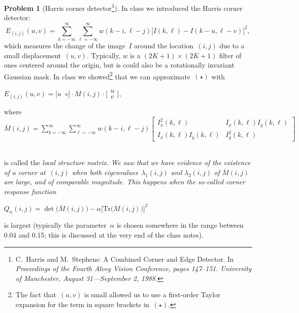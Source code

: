 \documentclass[11pt]{article}
\theoremstyle{plain}
\theoremstyle{definition}
\newtheorem{problem}{Problem}
\theoremstyle{remark}
\begin{document}
\begin{problem}[Harris corner detector\footnote{\label{fn}C.~Harris and 
	M.~Stephens: A Combined Corner and Edge Detector.
In \em Proceedings of the Fourth Alvey Vision Conference\em\/, pages 147--151. University of Manchester,
August 31---September 2,
1988.}]
In class we introduced the Harris corner detector:
$$
E_{(i,j)}(u,v)
= 
\sum_{k=-\infty}^{\infty}
\sum_{\ell=-\infty}^{\infty}
w(k-i,\ell-j)
\big[I(k,\ell)-I(k-u,\ell-v)\big]^2,
$$ 
which measures the change of the image~$I$ 
around the location~$(i,j)$
due to a small displacement~$(u,v)$. 
Typically, $w$ is a $(2K+1)\times(2K+1)$
filter of ones centered around the origin,
but is could also be a rotationally invariant
Gaussian mask. In class we showed\footnote{The fact that~$(u,v)$
is small allowed us to use a first-order
Taylor expansion for the term in square brackets in~$(\star)$.} 
 that we can approximate~$(\star)$ with
\par\vspace{.15cm}
\hfill
$\displaystyle
E_{(i,j)}(u,v)
= 
\big[u\;\;v\big]\cdot
\overline{M}(i,j)
\cdot
\Big[
\!
\begin{array}{c}
u \\
v
\end{array}%
\!
\Big],
$\hfill
\mbox{ }
\par\vspace{.15cm}
where
\hfill
$
\displaystyle
\overline{M}(i,j)
=
\sum_{k=-\infty}^{\infty}
\sum_{\ell=-\infty}^{\infty}
w(k-i,\ell-j)
\left[
\begin{array}{cc}
I_x^2(k,\ell) & I_x(k,\ell)I_y(k,\ell) \\
I_x(k,\ell)I_y(k,\ell) & I_y^2(k,\ell)
\end{array}
\right]
$
\hfill\mbox{ }
\par\vspace{.15cm} 
is called the \em local structure matrix\em\/.
We saw that we have evidence of the existence of a corner
at~$(i,j)$ when both eigenvalues~$\lambda_1(i,j)$ 
and 
$\lambda_2(i,j)$
of 
$\overline{M}(i,j)$ are large, and of comparable magnitude. 
This happens when the so-called 
\em corner response function \em
\par\vspace{-.4cm}
\hspace{8.5cm}
$
\boxed{
\displaystyle
Q_\alpha(i,j)
=
\det\big(
\overline{M}(i,j)
\big)
-\alpha \big[\mathrm{Tr}\big(\overline{M}(i,j)\big)\big]^2
}
$
\par\vspace{.1cm}
is largest (typically the parameter~$\alpha$ is chosen somewhere in the range between 0.04 and 0.15; this is discussed at the very end of the class notes). 

\end{problem}
\end{document}
